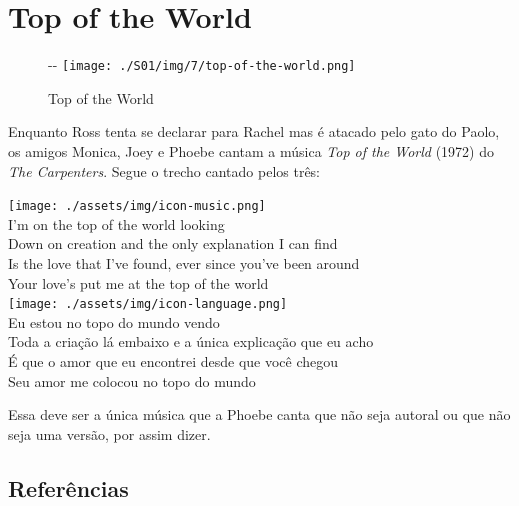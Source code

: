 \hypertarget{top-of-the-world}{%
\section{Top of the World}\label{top-of-the-world}}

\begin{figure}[!ht]
  \begin{adjustwidth}{-\oddsidemargin-1in}{-\rightmargin}
    \centering
    \texttt{[image: ./S01/img/7/top-of-the-world.png]}
    \caption{Top of the World\label{fig:top-of-the-world}}
  \end{adjustwidth}
\end{figure}

Enquanto Ross tenta se declarar para Rachel mas é atacado pelo gato do
Paolo, os amigos Monica, Joey e Phoebe cantam a música \emph{Top of the
World} (1972) do \emph{The Carpenters}. Segue o trecho cantado pelos
três:

\bigskip
\begin{tcolorbox}[enhanced,
    drop fuzzy shadow southeast, boxrule=0.3pt,
    lower separated=false, sidebyside, sidebyside align=top,
    halign=flush right, halign lower=left,
    colframe=black!30!dialogoBorder,colback=musicaBg]
\texttt{[image: ./assets/img/icon-music.png]}\\
I’m on the top of the world looking\\Down on creation and the only explanation I can find\\Is the love that I’ve found, ever since you’ve been around\\Your love’s put me at the top of the world\\
\tcblower
\texttt{[image: ./assets/img/icon-language.png]}\\
Eu estou no topo do mundo vendo\\Toda a criação lá embaixo e a única explicação que eu acho\\É que o amor que eu encontrei desde que você chegou\\Seu amor me colocou no topo do mundo\\
\end{tcolorbox}

Essa deve ser a única música que a Phoebe canta que não seja autoral ou
que não seja uma versão, por assim dizer.

\hypertarget{referuxeancias-1}{%
\subsection{Referências}\label{referuxeancias-1}}


